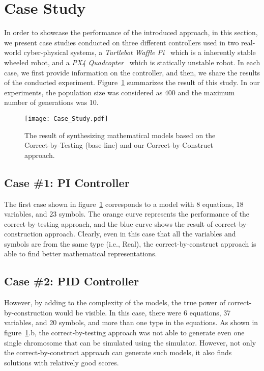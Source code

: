 \section{Case Study}
\label{sec:PreliminaryResult}
In order to showcase the performance of the introduced approach, in this section, we present case studies conducted on three different controllers used in two real-world cyber-physical systems, a \textit{Turtlebot Waffle Pi}~\citeme{} which is a inherently stable wheeled robot, and a \textit{PX4 Quadcopter}~\citeme{} which is statically unstable robot. In each case, we first provide information on the controller, and then, we share the results of the conducted experiment. Figure~\ref{fig:correct_by_construct_result} summarizes the result of this study. In our experiments, the population size was considered as 400 and the maximum number of generations was 10. 
%
\begin{figure}[ht]
  \centering
  \texttt{[image: Case\_Study.pdf]}
  \caption{The result of synthesizing mathematical models based on the Correct-by-Testing (base-line) and our Correct-by-Construct approach.}
  \label{fig:correct_by_construct_result}
\end{figure}
%
\subsection{Case \#1: PI Controller}
The first case shown in figure~\ref{fig:correct_by_construct_result} corresponds to a model with 8 equations, 18 variables, and 23 symbols. The orange curve represents the performance of the correct-by-testing approach, and the blue curve  shows the result of correct-by-construction approach. Clearly, even in this case that all the variables and symbols are from the same type (i.e., Real), the correct-by-construct approach is able to find better mathematical representations.

\subsection{Case \#2: PID Controller}
However, by adding to the complexity of the models, the true power of correct-by-construction would be visible. 
In this case, there were 6 equations, 37 variables, and 20 symbols, and more than one type in the equations. As shown in figure~\ref{fig:correct_by_construct_result}.b, the correct-by-testing approach was not able to generate even one single chromosome that can be simulated using the simulator. However, not only the correct-by-construct approach can generate such models, it also finds solutions with relatively good scores.

